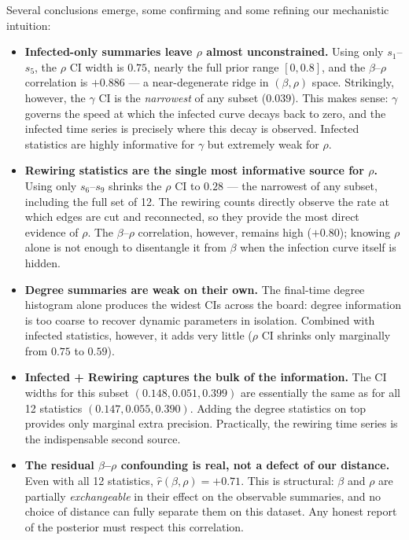 \documentclass[11pt]{article}
\begin{document}
Several conclusions emerge, some confirming and some refining our mechanistic intuition:
\begin{itemize}[nosep, leftmargin=10pt]
\item \textbf{Infected-only summaries leave $\rho$ almost unconstrained.} Using only $s_1$--$s_5$, the $\rho$ CI width is $0.75$, nearly the full prior range $[0,0.8]$, and the $\beta$--$\rho$ correlation is $+0.886$ --- a near-degenerate ridge in $(\beta,\rho)$ space. Strikingly, however, the $\gamma$ CI is the \emph{narrowest} of any subset ($0.039$). This makes sense: $\gamma$ governs the speed at which the infected curve decays back to zero, and the infected time series is precisely where this decay is observed. Infected statistics are highly informative for $\gamma$ but extremely weak for $\rho$.
\item \textbf{Rewiring statistics are the single most informative source for $\rho$.} Using only $s_6$--$s_9$ shrinks the $\rho$ CI to $0.28$ --- the narrowest of any subset, including the full set of 12. The rewiring counts directly observe the rate at which edges are cut and reconnected, so they provide the most direct evidence of $\rho$. The $\beta$--$\rho$ correlation, however, remains high ($+0.80$); knowing $\rho$ alone is not enough to disentangle it from $\beta$ when the infection curve itself is hidden.
\item \textbf{Degree summaries are weak on their own.} The final-time degree histogram alone produces the widest CIs across the board: degree information is too coarse to recover dynamic parameters in isolation. Combined with infected statistics, however, it adds very little ($\rho$ CI shrinks only marginally from $0.75$ to $0.59$).
\item \textbf{Infected + Rewiring captures the bulk of the information.} The CI widths for this subset $(0.148, 0.051, 0.399)$ are essentially the same as for all 12 statistics $(0.147, 0.055, 0.390)$. Adding the degree statistics on top provides only marginal extra precision. Practically, the rewiring time series is the indispensable second source.
\item \textbf{The residual $\beta$--$\rho$ confounding is real, not a defect of our distance.} Even with all 12 statistics, $\hat r(\beta,\rho) = +0.71$. This is structural: $\beta$ and $\rho$ are partially \emph{exchangeable} in their effect on the observable summaries, and no choice of distance can fully separate them on this dataset. Any honest report of the posterior must respect this correlation.
\end{itemize}
\end{document}
